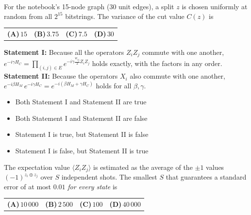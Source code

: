 \documentclass[11pt,a4paper]{article}
\newcommand{\optlabel}[1]{\textbf{(#1)}}
\newenvironment{qitem}[1]{\begin{list}{}{\setlength{\leftmargin}{3.3em}\setlength{\labelwidth}{3.1em}%
  \setlength{\labelsep}{0.2em}\setlength{\topsep}{3pt}\setlength{\parsep}{3pt}}\item[\textbf{Q.#1}\hfill]}{\end{list}}
\newcommand{\qsep}{\par\vspace{2pt}{\color{black!15}\hrule}\vspace{4pt}}
\begin{document}
\begin{qitem}{10}
For the notebook's 15-node graph ($30$ unit edges), a split $z$ is chosen uniformly at random from all $2^{15}$
bitstrings. The variance of the cut value $C(z)$ is
\par\smallskip\noindent\begin{tabularx}{\linewidth}{@{}*{4}{L}@{}}
\optlabel{A}\,$15$ & \optlabel{B}\,$3.75$ & \optlabel{C}\,$7.5$ & \optlabel{D}\,$30$
\end{tabularx}
\end{qitem}
\qsep

\begin{qitem}{11}
\textbf{Statement I:} Because all the operators $Z_iZ_j$ commute with one another,\\
\hspace*{1.5em}$e^{-i\gamma H_C} = \prod_{(i,j)\in E} e^{-i\gamma\frac{w_{ij}}{2} Z_iZ_j}$ holds exactly, with the factors in any order.\\[1mm]
\textbf{Statement II:} Because the operators $X_i$ also commute with one another,\\
\hspace*{1.5em}$e^{-i\beta H_M}\,e^{-i\gamma H_C} = e^{-i(\beta H_M + \gamma H_C)}$ holds for all $\beta, \gamma$.
\begin{itemize}[leftmargin=2.6em, labelsep=0.4em, itemsep=2pt, topsep=3pt]
\item[\optlabel{A}] Both Statement I and Statement II are true
\item[\optlabel{B}] Both Statement I and Statement II are false
\item[\optlabel{C}] Statement I is true, but Statement II is false
\item[\optlabel{D}] Statement I is false, but Statement II is true
\end{itemize}
\end{qitem}
\qsep

\begin{qitem}{12}
The expectation value $\langle Z_iZ_j\rangle$ is estimated as the average of the $\pm1$ values $(-1)^{z_i \oplus z_j}$ over
$S$ independent shots. The smallest $S$ that guarantees a standard error of at most $0.01$ \emph{for every state} is
\par\smallskip\noindent\begin{tabularx}{\linewidth}{@{}*{4}{L}@{}}
\optlabel{A}\,$10\,000$ & \optlabel{B}\,$2\,500$ & \optlabel{C}\,$100$ & \optlabel{D}\,$40\,000$
\end{tabularx}
\end{qitem}
\qsep
\end{document}
